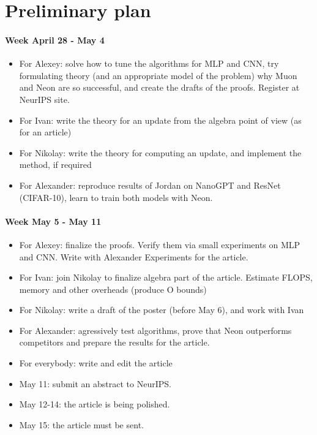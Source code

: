 \documentclass[]{scrartcl}
\begin{document}
\section{Preliminary plan}
\paragraph{Week April 28 - May 4}
\begin{itemize}
    \item For Alexey: solve how to tune the algorithms for MLP and CNN, try formulating theory (and an appropriate model of the problem) why Muon and Neon are so successful, and create the drafts of the proofs. Register at NeurIPS site.
    
    \item For Ivan: write the theory for an update from the algebra point of view (as for an article)
    
    \item For Nikolay: write the theory for computing an update, and implement the method, if required
    
    \item For Alexander: reproduce results of Jordan on NanoGPT and ResNet (CIFAR-10), learn to train both models with Neon.
\end{itemize}

\paragraph{Week May 5 - May 11}
\begin{itemize}
    \item For Alexey: finalize the proofs. Verify them via small experiments on MLP and CNN. Write with Alexander Experiments for the article.
    
    \item For Ivan: join Nikolay to finalize algebra part of the article. Estimate FLOPS, memory and other overheads (produce O bounds)
    
    \item For Nikolay: write a draft of the poster (before May 6), and work with Ivan
    
    \item For Alexander: agressively test algorithms, prove that Neon outperforms competitors and prepare the results for the article.
    
    \item For everybody: write and edit the article
    
    \item May 11: submit an abstract to NeurIPS.
    
    \item May 12-14: the article is being polished.
    
    \item May 15: the article must be sent.
\end{itemize}
\end{document}
